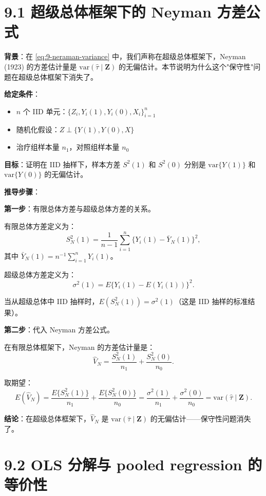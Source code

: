 \section{9.1 超级总体框架下的 Neyman 方差公式}\label{sec:appendix-8-studentized-t-cre}\label{sec:appendix-9-conservative}

\textbf{背景}：在 \cref{eq:9-neraman-variance} 中，我们声称在超级总体框架下，Neyman (1923) 的方差估计量是 $\mathrm{var}(\hat{\tau} \mid \mathbf{Z})$ 的无偏估计。本节说明为什么这个"保守性"问题在超级总体框架下消失了。

\textbf{给定条件}：
\begin{itemize}
  \item $n$ 个 IID 单元：$\{Z_i, Y_i(1), Y_i(0), X_i\}_{i=1}^n$
  \item 随机化假设：$Z \perp \{Y(1), Y(0), X\}$
  \item 治疗组样本量 $n_1$，对照组样本量 $n_0$
\end{itemize}

\textbf{目标}：证明在 IID 抽样下，样本方差 $S^2(1)$ 和 $S^2(0)$ 分别是 $\mathrm{var}\{Y(1)\}$ 和 $\mathrm{var}\{Y(0)\}$ 的无偏估计。

\textbf{推导步骤}：

\textbf{第一步}：有限总体方差与超级总体方差的关系。

有限总体方差定义为：
\[
S_N^2(1) = \frac{1}{n-1}\sum_{i=1}^n \{Y_i(1) - \bar{Y}_N(1)\}^2,
\]
其中 $\bar{Y}_N(1) = n^{-1}\sum_{i=1}^n Y_i(1)$。

超级总体方差定义为：
\[
\sigma^2(1) = E\{Y_i(1) - E(Y_i(1))\}^2.
\]

当从超级总体中 IID 抽样时，$E(S_N^2(1)) = \sigma^2(1)$（这是 IID 抽样的标准结果）。

\textbf{第二步}：代入 Neyman 方差公式。

在有限总体框架下，Neyman 的方差估计量是：
\[
\hat{V}_N = \frac{S_N^2(1)}{n_1} + \frac{S_N^2(0)}{n_0}.
\]

取期望：
\[
E(\hat{V}_N) = \frac{E\{S_N^2(1)\}}{n_1} + \frac{E\{S_N^2(0)\}}{n_0} = \frac{\sigma^2(1)}{n_1} + \frac{\sigma^2(0)}{n_0} = \mathrm{var}(\hat{\tau} \mid \mathbf{Z}).
\]

\textbf{结论}：在超级总体框架下，$\hat{V}_N$ 是 $\mathrm{var}(\hat{\tau} \mid \mathbf{Z})$ 的无偏估计——保守性问题消失了。

\section{9.2 OLS 分解与 pooled regression 的等价性}\label{sec:appendix-9-ols-decomposition}

